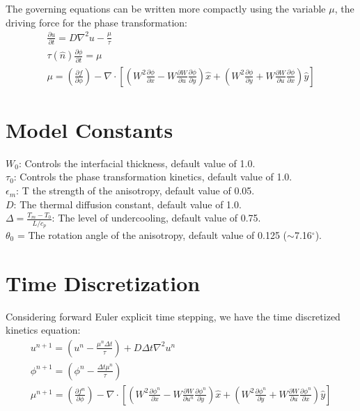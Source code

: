 \documentclass[10pt]{article}
\begin{document}
The governing equations can be written more compactly using the variable $\mu$, the driving force for the phase transformation:
\begin{gather}
\frac{\partial u}{\partial t} = D \nabla^2 u - \frac{\mu}{\tau} \\
\tau(\hat{n}) \frac{\partial \phi}{\partial t} = \mu \\
\mu = \left(\frac{\partial f}{\partial \phi}\right) - \nabla \cdot \left[\left(W^2 \frac{\partial \phi}{\partial x} - W \frac{\partial W}{\partial u} \frac{\partial \phi}{\partial y}\right)\hat{x}  + \left(W^2 \frac{\partial \phi}{\partial y} + W \frac{\partial W}{\partial u} \frac{\partial \phi}{\partial x}\right) \hat{y} \right]
\end{gather}

\section{Model Constants}
$W_0$: Controls the interfacial thickness, default value of 1.0. \\
$\tau_0$: Controls the phase transformation kinetics, default value of 1.0. \\
$\epsilon_m$: T the strength of the anisotropy, default value of 0.05. \\
$D$: The thermal diffusion constant, default value of 1.0. \\
$\Delta = \frac{T_m-T_0}{L/c_p}$: The level of undercooling, default value of 0.75. \\
$\theta_0$ = The rotation angle of the anisotropy, default value of 0.125 ($\sim$7.16$^\circ$).

\section{Time Discretization}
Considering forward Euler explicit time stepping, we have the time discretized kinetics equation:
\begin{gather}
u^{n+1} = \left(u^{n} - \frac{\mu^n \Delta t}{\tau}\right) + D \Delta t \nabla^2 u^n \\
\phi^{n+1} = \left(\phi^n - \frac{\Delta t \mu^n}{\tau}\right) \\
 \mu^{n+1} = \left(\frac{\partial f^n}{\partial \phi}\right) - \nabla \cdot \left[\left(W^2 \frac{\partial \phi^n}{\partial x} - W \frac{\partial W}{\partial u^n} \frac{\partial \phi^n}{\partial y}\right)\hat{x}  + \left(W^2 \frac{\partial \phi^n}{\partial y} + W \frac{\partial W}{\partial u} \frac{\partial \phi^n}{\partial x}\right) \hat{y} \right]
\end{gather}
\end{document}

